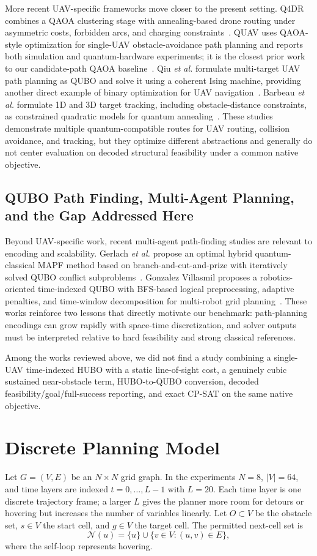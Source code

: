 \documentclass[letterpaper]{article} %
\begin{document}
More recent UAV-specific frameworks move closer to the present setting. Q4DR combines a QAOA clustering stage with annealing-based drone routing under asymmetric costs, forbidden arcs, and charging constraints~\cite{osaba2025q4dr}. QUAV uses QAOA-style optimization for single-UAV obstacle-avoidance path planning and reports both simulation and quantum-hardware experiments; it is the closest prior work to our candidate-path QAOA baseline~\cite{innan2025quav}. Qiu \emph{et al.} formulate multi-target UAV path planning as QUBO and solve it using a coherent Ising machine, providing another direct example of binary optimization for UAV navigation~\cite{qiu2025quantum}. Barbeau \emph{et al.} formulate 1D and 3D target tracking, including obstacle-distance constraints, as constrained quadratic models for quantum annealing~\cite{barbeau2025tracking}. These studies demonstrate multiple quantum-compatible routes for UAV routing, collision avoidance, and tracking, but they optimize different abstractions and generally do not center evaluation on decoded structural feasibility under a common native objective.

\subsection{QUBO Path Finding, Multi-Agent Planning, and the Gap Addressed Here}
Beyond UAV-specific work, recent multi-agent path-finding studies are relevant to encoding and scalability. Gerlach \emph{et al.} propose an optimal hybrid quantum-classical MAPF method based on branch-and-cut-and-prize with iteratively solved QUBO conflict subproblems~\cite{gerlach2025hybrid}. Gonzalez Villasmil proposes a robotics-oriented time-indexed QUBO with BFS-based logical preprocessing, adaptive penalties, and time-window decomposition for multi-robot grid planning~\cite{gonzalez2026scalable}. These works reinforce two lessons that directly motivate our benchmark: path-planning encodings can grow rapidly with space-time discretization, and solver outputs must be interpreted relative to hard feasibility and strong classical references.

Among the works reviewed above, we did not find a study combining a single-UAV time-indexed HUBO with a static line-of-sight cost, a genuinely cubic sustained near-obstacle term, HUBO-to-QUBO conversion, decoded feasibility/goal/full-success reporting, and exact CP-SAT on the same native objective.

\section{Discrete Planning Model}
Let $G=(V,E)$ be an $N\times N$ grid graph. In the experiments $N=8$, $|V|=64$, and time layers are indexed $t=0,\ldots,L-1$ with $L=20$. Each time layer is one discrete trajectory frame; a larger $L$ gives the planner more room for detours or hovering but increases the number of variables linearly. Let $O\subset V$ be the obstacle set, $s\in V$ the start cell, and $g\in V$ the target cell. The permitted next-cell set is
\begin{equation}
\mathcal{N}(u)=\{u\}\cup\{v\in V:(u,v)\in E\},
\end{equation}
where the self-loop represents hovering.
\end{document}
